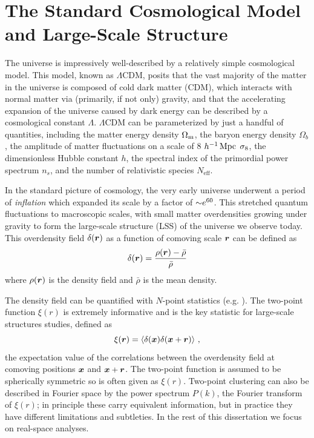 \graphicspath{{figures/figures_intro/}}


\section{The Standard Cosmological Model and Large-Scale Structure}

The universe is impressively well-described by a relatively simple cosmological model.
This model, known as $\Lambda$CDM, posits that the vast majority of the matter in the universe is composed of cold dark matter (CDM), which interacts with normal matter via (primarily, if not only) gravity, and that the accelerating expansion of the universe caused by dark energy can be described by a cosmological constant $\Lambda$.
$\Lambda$CDM can be parameterized by just a handful of quantities, including the matter energy density $\Omega_\mathrm{m}$, the baryon energy density $\Omega_{b}$, the amplitude of matter fluctuations on a scale of 8 $h^{-1}\,\mathrm{Mpc}$ $\sigma_\mathrm{8}$, the dimensionless Hubble constant $h$, the spectral index of the primordial power spectrum $n_{s}$, and the number of relativistic species $N_{\mathrm{eff}}$. 

In the standard picture of cosmology, the very early universe underwent a period of \emph{inflation} which expanded its scale by a factor of $\mathord{\sim} e^{60}$.
This stretched quantum fluctuations to macroscopic scales, with small matter overdensities growing under gravity to form the large-scale structure (LSS) of the universe we observe today.
This overdensity field $\delta(\bm{r})$ as a function of comoving scale $\bm{r}$ can be defined as
\begin{equation}
    \delta(\bm{r}) = \frac{\rho(\bm{r}) - \bar{\rho}}{\bar{\rho}}
\end{equation}
where $\rho(\bm{r})$ is the density field and $\bar{\rho}$ is the mean density.

The density field can be quantified with $N$-point statistics (e.g. \citealt{peebles_large-scale_1980}).
The two-point function $\xi(r)$ is extremely informative and is the key statistic for large-scale structures studies, defined as
\begin{equation}
    \label{eq:xi}
    \xi(\bm{r}) = \langle \delta(\bm{x}) \delta(\bm{x} + \bm{r}) \rangle ~,
\end{equation}
the expectation value of the correlations between the overdensity field at comoving positions $\bm{x}$ and $\bm{x}+\bm{r}$.
The two-point function is assumed to be spherically symmetric so is often given as $\xi(r)$.
Two-point clustering can also be described in Fourier space by the power spectrum $P(k)$, the Fourier transform of $\xi(r)$; in principle these carry equivalent information, but in practice they have different limitations and subtleties.
In the rest of this dissertation we focus on real-space analyses.

